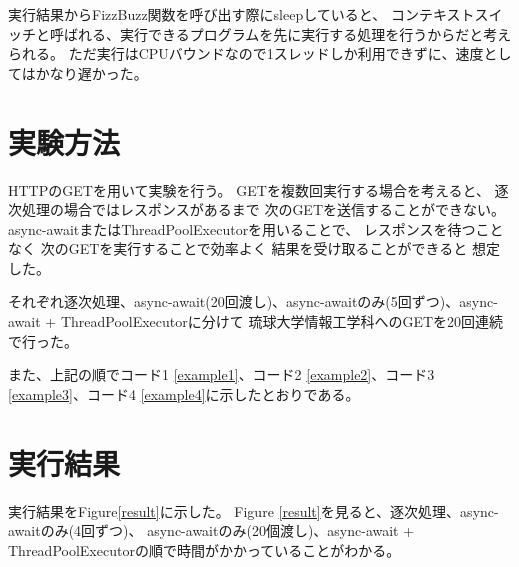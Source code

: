 \documentclass[14pt, oneside]{article}     	%
\begin{document}
実行結果からFizzBuzz関数を呼び出す際にsleepしていると、
コンテキストスイッチと呼ばれる、実行できるプログラムを先に実行する処理を行うからだと考えられる。
ただ実行はCPUバウンドなので1スレッドしか利用できずに、速度としてはかなり遅かった。

\newpage

\section{実験方法}

HTTPのGETを用いて実験を行う。
GETを複数回実行する場合を考えると、
逐次処理の場合ではレスポンスがあるまで
次のGETを送信することができない。
async-awaitまたはThreadPoolExecutorを用いることで、
レスポンスを待つことなく
次のGETを実行することで効率よく
結果を受け取ることができると
想定した。

それぞれ逐次処理、async-await(20回渡し)、async-awaitのみ(5回ずつ)、async-await + ThreadPoolExecutorに分けて
琉球大学情報工学科へのGETを20回連続で行った。

また、上記の順でコード1 \ref{example1}、コード2 \ref{example2}、コード3 \ref{example3}、コード4 \ref{example4}に示したとおりである。





\newpage





\newpage

\section{実行結果}



実行結果をFigure\ref{result}に示した。
Figure \ref{result}を見ると、逐次処理、async-awaitのみ(4回ずつ)、
async-awaitのみ(20個渡し)、async-await + ThreadPoolExecutorの順で時間がかかっていることがわかる。
\end{document}
